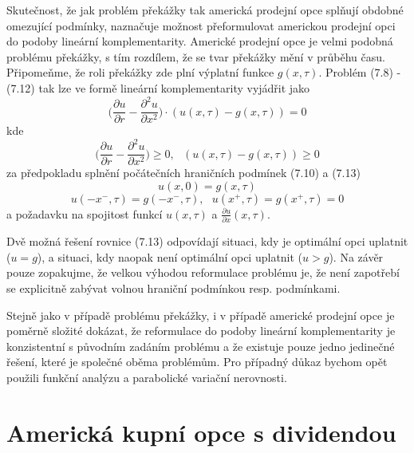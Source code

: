 \documentclass[a4paper]{book}
\begin{document}
Skutečnost, že jak problém překážky tak americká prodejní opce splňují obdobné omezující podmínky, naznačuje možnost přeformulovat americkou prodejní opci do podoby lineární komplementarity. Americké prodejní opce je velmi podobná problému překážky, s tím rozdílem, že se tvar překážky mění v průběhu času. Připomeňme, že roli překážky zde plní výplatní funkce $g(x, \tau)$. Problém (7.8) - (7.12) tak lze ve formě lineární komplementarity vyjádřit jako
\begin{equation}
\Bigg( \frac{\partial u}{\partial r} - \frac{\partial^2 u}{\partial x^2}\Bigg) \cdot (u(x, \tau) - g(x, \tau)) = 0
\end{equation}
kde
\begin{equation*}
\Bigg( \frac{\partial u}{\partial r} - \frac{\partial^2 u}{\partial x^2}\Bigg) \ge 0,~~~(u(x, \tau) - g(x, \tau)) \ge 0
\end{equation*}
za předpokladu splnění počátečních hraničních podmínek (7.10) a (7.13)
\begin{equation*}
u(x, 0) = g(x, \tau)
\end{equation*}
\begin{equation*}
u(-x^{-}, \tau) = g(-x^{-}, \tau),~~~u(x^{+}, \tau) = g(x^{+}, \tau) = 0
\end{equation*}
a požadavku na spojitost funkcí $u(x, \tau)$ a $\frac{\partial u}{\partial x}(x, \tau)$.

Dvě možná řešení rovnice (7.13) odpovídají situaci, kdy je optimální opci uplatnit ($u = g$), a situaci, kdy naopak není optimální opci uplatnit ($u > g$). Na závěr pouze zopakujme, že velkou výhodou reformulace problému je, že není zapotřebí se explicitně zabývat volnou hraniční podmínkou resp. podmínkami.

Stejně jako v případě problému překážky, i v případě americké prodejní opce je poměrně složité dokázat, že reformulace do podoby lineární komplementarity je konzistentní s původním zadáním problému a že existuje pouze jedno jedinečné řešení, které je společné oběma problémům. Pro případný důkaz bychom opět použili funkční analýzu a parabolické variační nerovnosti.

\section{Americká kupní opce s dividendou}
\end{document}
